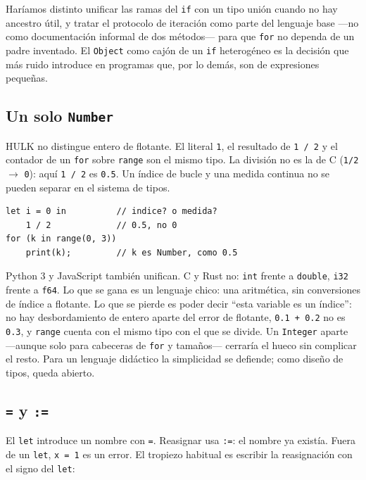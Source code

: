 \documentclass[11pt,a4paper]{article}
\begin{document}
Haríamos distinto unificar las ramas del \texttt{if} con un tipo unión cuando no hay ancestro útil, y tratar el protocolo de iteración como parte del lenguaje base ---no como documentación informal de dos métodos--- para que \texttt{for} no dependa de un padre inventado. El \texttt{Object} como cajón de un \texttt{if} heterogéneo es la decisión que más ruido introduce en programas que, por lo demás, son de expresiones pequeñas.

\subsection{Un solo \texttt{Number}}

HULK no distingue entero de flotante. El literal \texttt{1}, el resultado de \texttt{1 / 2} y el contador de un \texttt{for} sobre \texttt{range} son el mismo tipo. La división no es la de C (\texttt{1/2} $\rightarrow$ \texttt{0}): aquí \texttt{1 / 2} es \texttt{0.5}. Un índice de bucle y una medida continua no se pueden separar en el sistema de tipos.

\begin{lstlisting}[language={},numbers=none]
let i = 0 in          // indice? o medida?
    1 / 2             // 0.5, no 0
for (k in range(0, 3))
    print(k);         // k es Number, como 0.5
\end{lstlisting}

Python 3 y JavaScript también unifican. C y Rust no: \texttt{int} frente a \texttt{double}, \texttt{i32} frente a \texttt{f64}. Lo que se gana es un lenguaje chico: una aritmética, sin conversiones de índice a flotante. Lo que se pierde es poder decir ``esta variable es un índice'': no hay desbordamiento de entero aparte del error de flotante, \texttt{0.1 + 0.2} no es \texttt{0.3}, y \texttt{range} cuenta con el mismo tipo con el que se divide. Un \texttt{Integer} aparte ---aunque solo para cabeceras de \texttt{for} y tamaños--- cerraría el hueco sin complicar el resto. Para un lenguaje didáctico la simplicidad se defiende; como diseño de tipos, queda abierto.

\subsection{\texttt{=} y \texttt{:=}}

El \texttt{let} introduce un nombre con \texttt{=}. Reasignar usa \texttt{:=}: el nombre ya existía. Fuera de un \texttt{let}, \texttt{x = 1} es un error. El tropiezo habitual es escribir la reasignación con el signo del \texttt{let}:
\end{document}
